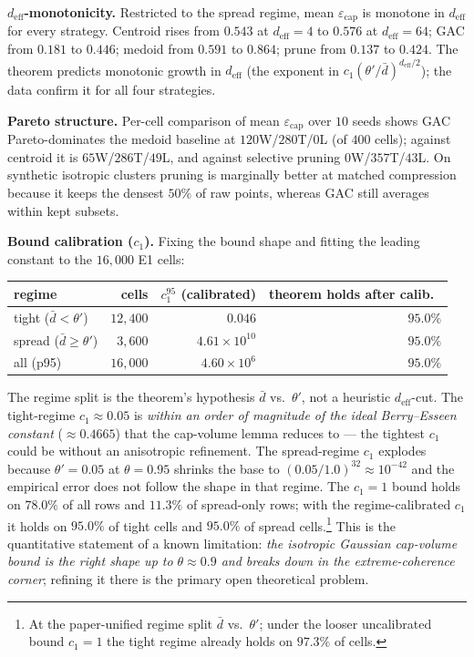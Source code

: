 \documentclass[11pt]{article}
\theoremstyle{definition}
\theoremstyle{remark}
\newcommand{\deff}{d_{\mathrm{eff}}}
\newcommand{\dbar}{\bar{d}}
\newcommand{\thetap}{\theta'}
\newcommand{\eps}{\varepsilon}
\begin{document}
\textbf{$\deff$-monotonicity.} Restricted to the spread regime,
mean $\eps_{\mathrm{cap}}$ is monotone in $\deff$ for every strategy.
Centroid rises from $0.543$ at $\deff=4$ to $0.576$ at $\deff=64$;
GAC from $0.181$ to $0.446$; medoid from $0.591$ to $0.864$;
prune from $0.137$ to $0.424$. The theorem predicts monotonic growth
in $\deff$ (the exponent in $c_1(\thetap/\dbar)^{\deff/2}$);
the data confirm it for all four strategies.

\textbf{Pareto structure.} Per-cell comparison of mean
$\eps_{\mathrm{cap}}$ over $10$ seeds shows GAC Pareto-dominates the
medoid baseline at $120$W/$280$T/$0$L (of $400$ cells);
against centroid it is $65$W/$286$T/$49$L, and against selective
pruning $0$W/$357$T/$43$L. On synthetic isotropic clusters pruning
is marginally better at matched compression because it keeps the
densest $50\%$ of raw points, whereas GAC still averages within
kept subsets.

\textbf{Bound calibration ($c_1$).} Fixing the bound shape and
fitting the leading constant to the $16{,}000$ E1 cells:
\begin{center}
\begin{tabular}{lrrr}
\toprule
regime & cells & $c_1^{95}$ (calibrated) & theorem holds after calib.\ \\
\midrule
tight ($\dbar < \thetap$)  & $12{,}400$ & $0.046$ & $95.0\%$ \\
spread ($\dbar \geq \thetap$) & $3{,}600$ & $4.61\times 10^{10}$ & $95.0\%$ \\
all (p95) & $16{,}000$ & $4.60\times 10^{6}$ & $95.0\%$ \\
\bottomrule
\end{tabular}
\end{center}
The regime split is the theorem's hypothesis $\dbar$ vs.\ $\thetap$,
not a heuristic $\deff$-cut. The tight-regime $c_1 \approx 0.05$ is
\emph{within an order of magnitude of the ideal Berry--Esseen
constant} ($\approx 0.4665$) that the cap-volume lemma reduces to ---
the tightest $c_1$ could be without an anisotropic refinement.
The spread-regime $c_1$ explodes because $\thetap=0.05$ at $\theta=0.95$
shrinks the base to $(0.05/1.0)^{32} \approx 10^{-42}$ and the empirical
error does not follow the shape in that regime. The $c_1=1$ bound holds
on $78.0\%$ of all rows and $11.3\%$ of spread-only rows; with the
regime-calibrated $c_1$ it holds on $95.0\%$ of tight cells and
$95.0\%$ of spread cells.\footnote{At the paper-unified regime split
$\dbar$ vs.\ $\thetap$; under the looser uncalibrated bound $c_1{=}1$
the tight regime already holds on $97.3\%$ of cells.} This is the quantitative
statement of a known limitation: \emph{the isotropic Gaussian
cap-volume bound is the right shape up to $\theta \approx 0.9$ and breaks
down in the extreme-coherence corner}; refining it there is the
primary open theoretical problem.
\end{document}
